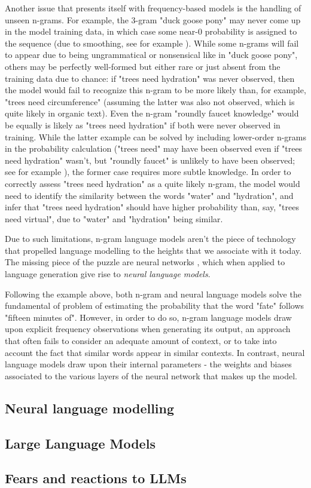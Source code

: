 Another issue that presents itself with frequency-based models is the handling of unseen n-grams. For example, the 3-gram "duck goose pony" may never come up in the model training data, in which case some near-0 probability is assigned to the sequence (due to smoothing, see for example \citealp{citationneeded}).
While some n-grams will fail to appear due to being ungrammatical or nonsensical like in "duck goose pony", others may be perfectly well-formed but either rare or just absent from the training data due to chance: if "trees need hydration" was never observed, then the model would fail to recognize this n-gram to be more likely than, for example, "trees need circumference" (assuming the latter was also not observed, which is quite likely in organic text).
Even the n-gram "roundly faucet knowledge" would be equally is likely as "trees need hydration" if both were never observed in training. While the latter example can be solved by including lower-order n-grams in the probability calculation ("trees need" may have been observed even if "trees need hydration" wasn't, but "roundly faucet" is unlikely to have been observed; see for example \citealp{citationneeded}), the former case requires more subtle knowledge.
In order to correctly assess "trees need hydration" as a quite likely n-gram, the model would need to identify the similarity between the words "water" and "hydration", and infer that "trees need hydration" should have higher probability than, say, "trees need virtual", due to "water" and "hydration" being similar.

Due to such limitations, n-gram language models aren't the piece of technology that propelled language modelling to the heights that we associate with it today.
The missing piece of the puzzle are neural networks \citep{citationneeded}, which when applied to language generation give rise to \emph{neural language models}. \citep{citationneeded}

Following the example above, both n-gram and neural language models solve the fundamental of problem of estimating the probability that the word "fate" follows "fifteen minutes of".
However, in order to do so, n-gram language models draw upon explicit frequency observations when generating its output, an approach that often fails to consider an adequate amount of context, or to take into account the fact that similar words appear in similar contexts.
In contrast, neural language models draw upon their internal parameters - the weights and biases \citep{citationneeded} associated to the various layers of the neural network that makes up the model. \citep{citationneeded}

\subsection{Neural language modelling}

\subsection{Large Language Models}
\subsection{Fears and reactions to LLMs}
